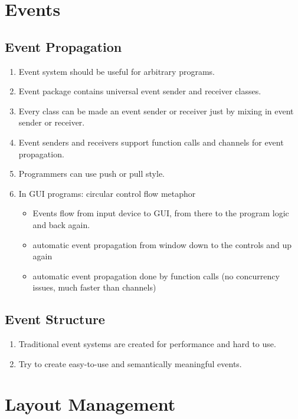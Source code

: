 \documentclass[12pt,a4paper]{article}
\begin{document}
\section{Events}

\subsection{Event Propagation}

\begin{enumerate}
\item
  Event system should be useful for arbitrary programs.
\item
  Event package contains universal event sender and receiver classes.
\item
  Every class can be made an event sender or receiver just by mixing in
  event sender or receiver.
\item
  Event senders and receivers support function calls and channels for
  event propagation.
\item
  Programmers can use push or pull style.
\item
  In GUI programs: circular control flow metaphor

  \begin{itemize}
  \item
    Events flow from input device to GUI, from there to the program
    logic and back again.
  \item
    automatic event propagation from window down to the controls and up
    again
  \item
    automatic event propagation done by function calls (no concurrency
    issues, much faster than channels)
  \end{itemize}
\end{enumerate}

\subsection{Event Structure}

\begin{enumerate}
\item
  Traditional event systems are created for performance and hard to use.
\item
  Try to create easy-to-use and semantically meaningful events.
\end{enumerate}


\section{Layout Management}
\end{document}
